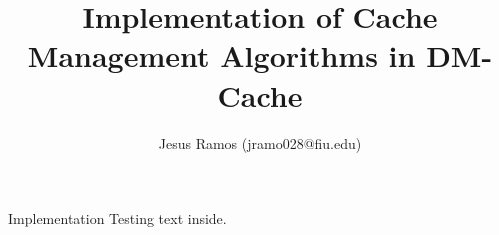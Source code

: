 \documentclass[final]{beamer}
\title{Implementation of Cache Management Algorithms in DM-Cache}
\author{Jesus Ramos (jramo028@fiu.edu)}
\institute[FIU]{Florida International University}
\date{}
\begin{document}
\begin{frame}{}

  \begin{block}{\large Implementation}
    Testing text inside.
  \end{block}

\end{frame}
\end{document}
